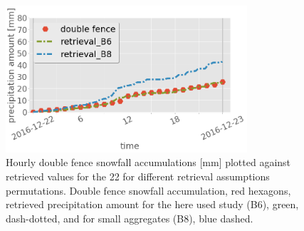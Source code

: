 %
\begin{figure}[t]
	\centering
	\includegraphics[width=0.8\textwidth]{./fig_obs_ret/20161222_2}
	\caption{Hourly double fence snowfall accumulations [mm] plotted against retrieved values for the \SI{22}{\dec} for different retrieval assumptions permutations. Double fence snowfall accumulation, red hexagons, retrieved precipitation amount for the here used study (B6), green, dash-dotted, and for small aggregates (B8), blue dashed.}\label{fig:ret_sensitivity}
\end{figure}
%
\noindent
\\
